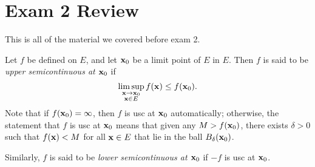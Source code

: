 \section{Exam 2 Review}
This is all of the material we covered before exam 2.

\bigskip

Let $f$ be defined on $E$, and let $\mathbf{x}_0$ be a limit point of $E$ in
$E$. Then $f$ is said to be \emph{upper semicontinuous at $\mathbf{x}_0$} if
\begin{equation}
  \label{eq:upper-semicontinuous}
\limsup_{\substack{\mathbf{x}\to\mathbf{x}_0\\\mathbf{x}\in E}}f(\mathbf{x})\leq f(\mathbf{x}_0).
\end{equation}
Note that if $f(\mathbf{x}_0)=\infty$, then $f$ is usc at $\mathbf{x}_0$
automatically; otherwise, the statement that $f$ is usc at $\mathbf{x}_0$ means
that given any $M>f(\mathbf{x}_0)$, there exists $\delta>0$ such that $f(\mathbf{x})<M$
for all $\mathbf{x}\in E$ that lie in the ball $B_\delta(\mathbf{x}_0)$.

Similarly, $f$ is said to be \emph{lower semicontinuous at $\mathbf{x}_0$} if
$-f$ is usc at $\mathbf{x}_0$.

